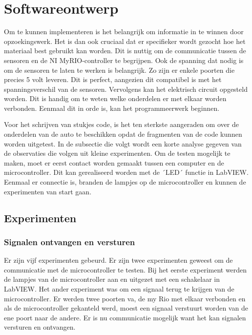\documentclass[a4paper,twoside,kulak]{kulakreport} %
\begin{document}
\label{Assemblage}

\section{Softwareontwerp}\label{Softwareontwerp}

Om te kunnen implementeren is het belangrijk om informatie in te winnen door opzoekingswerk. Het is dan ook cruciaal dat er specifieker wordt gezocht hoe het materiaal best gebruikt kan worden.
Dit is nuttig om de communicatie tussen de sensoren en de NI MyRIO-controller te begrijpen. Ook de spanning dat nodig is om de sensoren te laten te werken is belangrijk. Zo zijn er enkele poorten die precies 5 volt leveren. Dit is perfect, aangezien dit compatibel is met het spanningsverschil van de sensoren. Vervolgens kan het elektrisch circuit opgesteld worden. Dit is handig om te weten welke onderdelen er met elkaar worden verbonden. Eenmaal dit in orde is, kan het programmeerwerk beginnen.

Voor het schrijven van stukjes code, is het ten sterkste aangeraden om over de onderdelen van de auto te beschikken opdat de fragmenten van de code kunnen worden uitgetest. In de subsectie die volgt wordt een korte analyse gegeven van de observaties die volgen uit kleine experimenten. Om de testen mogelijk te maken, moet er eerst contact worden gemaakt tussen een computer en de microcontroller. Dit kan gerealiseerd worden met de ´LED´ functie in LabVIEW. Eenmaal er connectie is, branden de lampjes op de microcontroller en kunnen de experimenten van start gaan.


\subsection{Experimenten}
\subsubsection{Signalen ontvangen en versturen}
Er zijn vijf experimenten gebeurd. Er zijn twee experimenten geweest om de communicatie met de microcontroller te testen. 
Bij het eerste experiment werden de lampjes van de microcontroller aan en uitgezet met een schakelaar in LabVIEW.
Het ander experiment was om een signaal terug te krijgen van de microcontroller.
Er werden twee poorten va, de my Rio met elkaar verbonden en als de microcontroller gekanteld werd, moest een signaal verstuurt worden van de ene poort naar de andere.
Er is nu communicatie mogelijk want het kan signalen versturen en ontvangen.
\end{document}
